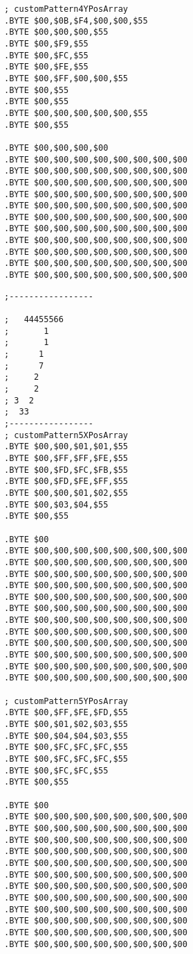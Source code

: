 \begin{minipage}[b]{0.33\linewidth}
\begin{lrbox}{\mybox}
\begin{lstlisting}[basicstyle=\ttfamily\tiny]
; customPattern4YPosArray
.BYTE $00,$0B,$F4,$00,$00,$55
.BYTE $00,$00,$00,$55
.BYTE $00,$F9,$55
.BYTE $00,$FC,$55
.BYTE $00,$FE,$55
.BYTE $00,$FF,$00,$00,$55
.BYTE $00,$55
.BYTE $00,$55
.BYTE $00,$00,$00,$00,$00,$55
.BYTE $00,$55

.BYTE $00,$00,$00,$00
.BYTE $00,$00,$00,$00,$00,$00,$00,$00
.BYTE $00,$00,$00,$00,$00,$00,$00,$00
.BYTE $00,$00,$00,$00,$00,$00,$00,$00
.BYTE $00,$00,$00,$00,$00,$00,$00,$00
.BYTE $00,$00,$00,$00,$00,$00,$00,$00
.BYTE $00,$00,$00,$00,$00,$00,$00,$00
.BYTE $00,$00,$00,$00,$00,$00,$00,$00
.BYTE $00,$00,$00,$00,$00,$00,$00,$00
.BYTE $00,$00,$00,$00,$00,$00,$00,$00
.BYTE $00,$00,$00,$00,$00,$00,$00,$00
.BYTE $00,$00,$00,$00,$00,$00,$00,$00

\end{lstlisting}
\end{lrbox}%
\scalebox{0.8}{\usebox{\mybox}}
\end{minipage}
\begin{minipage}[b]{0.33\linewidth}
\begin{lrbox}{\mybox}%
\begin{lstlisting}[basicstyle=\ttfamily\tiny]
;-----------------

;   44455566
;       1   
;       1   
;      1    
;      7    
;     2     
;     2     
; 3  2      
;  33       
;-----------------
; customPattern5XPosArray
.BYTE $00,$00,$01,$01,$55
.BYTE $00,$FF,$FF,$FE,$55
.BYTE $00,$FD,$FC,$FB,$55
.BYTE $00,$FD,$FE,$FF,$55
.BYTE $00,$00,$01,$02,$55
.BYTE $00,$03,$04,$55
.BYTE $00,$55

.BYTE $00
.BYTE $00,$00,$00,$00,$00,$00,$00,$00
.BYTE $00,$00,$00,$00,$00,$00,$00,$00
.BYTE $00,$00,$00,$00,$00,$00,$00,$00
.BYTE $00,$00,$00,$00,$00,$00,$00,$00
.BYTE $00,$00,$00,$00,$00,$00,$00,$00
.BYTE $00,$00,$00,$00,$00,$00,$00,$00
.BYTE $00,$00,$00,$00,$00,$00,$00,$00
.BYTE $00,$00,$00,$00,$00,$00,$00,$00
.BYTE $00,$00,$00,$00,$00,$00,$00,$00
.BYTE $00,$00,$00,$00,$00,$00,$00,$00
.BYTE $00,$00,$00,$00,$00,$00,$00,$00
.BYTE $00,$00,$00,$00,$00,$00,$00,$00

; customPattern5YPosArray
.BYTE $00,$FF,$FE,$FD,$55
.BYTE $00,$01,$02,$03,$55
.BYTE $00,$04,$04,$03,$55
.BYTE $00,$FC,$FC,$FC,$55
.BYTE $00,$FC,$FC,$FC,$55
.BYTE $00,$FC,$FC,$55
.BYTE $00,$55

.BYTE $00
.BYTE $00,$00,$00,$00,$00,$00,$00,$00
.BYTE $00,$00,$00,$00,$00,$00,$00,$00
.BYTE $00,$00,$00,$00,$00,$00,$00,$00
.BYTE $00,$00,$00,$00,$00,$00,$00,$00
.BYTE $00,$00,$00,$00,$00,$00,$00,$00
.BYTE $00,$00,$00,$00,$00,$00,$00,$00
.BYTE $00,$00,$00,$00,$00,$00,$00,$00
.BYTE $00,$00,$00,$00,$00,$00,$00,$00
.BYTE $00,$00,$00,$00,$00,$00,$00,$00
.BYTE $00,$00,$00,$00,$00,$00,$00,$00
.BYTE $00,$00,$00,$00,$00,$00,$00,$00
.BYTE $00,$00,$00,$00,$00,$00,$00,$00


\end{lstlisting}
\end{lrbox}%
\scalebox{0.8}{\usebox{\mybox}}
\end{minipage}
